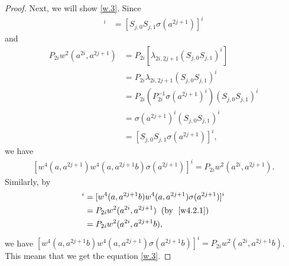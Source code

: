 \documentclass[a4paper,11pt]{amsart}
\numberwithin{equation}{section}
\begin{document}
\begin{proof}
Next, we will show  \eqref{w.3}. Since
\begin{align*}
[w^4(a,a^{2j+1}) w^4(a,a^{2j+1}b) \sigma(a^{2j+1})]^i&=[S_{j,0} S_{j,1} \sigma(a^{2j+1})]^i
\end{align*}
and
\begin{align*}
P_{2i} w^2(a^{2i}, a^{2j+1})&=P_{2i}[\lambda_{2i,2j+1} (S_{j,0} S_{j,1})^i]\\
&=P_{2i} \lambda_{2i,2j+1} (S_{j,0} S_{j,1})^i\\
&=P_{2i} (P_{2i}^{-1} \sigma(a^{2j+1})^i) (S_{j,0} S_{j,1})^i\\
&=\sigma(a^{2j+1})^i (S_{j,0} S_{j,1})^i\\
&=[S_{j,0} S_{j,1} \sigma(a^{2j+1})]^i,
\end{align*}
we have
\begin{align}
\label{w4.2.1} [w^4(a,a^{2j+1}) w^4(a,a^{2j+1}b) \sigma(a^{2j+1})]^i=P_{2i} w^2(a^{2i},a^{2j+1}).
\end{align}
 Similarly, by
\begin{align*}
[w^4(a,a^{2j+1}b) w^4(a,a^{2j+1}) \sigma(a^{2j+1}b)]^i&=[w^4(a,a^{2j+1}b) w^4(a,a^{2j+1}) \sigma(a^{2j+1})]^i\\
&=P_{2i} w^2(a^{2i},a^{2j+1})\;\;(\text{by }\;\eqref{w4.2.1})\\
&=P_{2i} w^2(a^{2i},a^{2j+1}b),
\end{align*}
we have $[w^4(a,a^{2j+1}b) w^4(a,a^{2j+1}) \sigma(a^{2j+1}b)]^i=P_{2i} w^2(a^{2i},a^{2j+1}b)$. This means that we get the equation \eqref{w.3}.


\end{proof}
\end{document}
